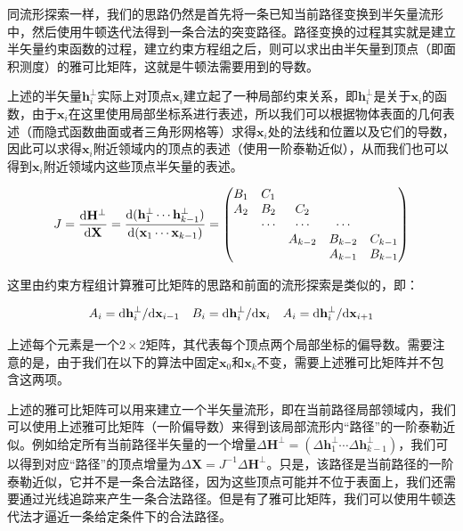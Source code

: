 同流形探索一样，我们的思路仍然是首先将一条已知当前路径变换到半矢量流形中，然后使用牛顿迭代法得到一条合法的突变路径。路径变换的过程其实就是建立半矢量约束函数的过程，建立约束方程组之后，则可以求出由半矢量到顶点（即面积测度）的雅可比矩阵，这就是牛顿法需要用到的导数。

上述的半矢量$\mathbf{h}^{\perp}_{i}$实际上对顶点$\mathbf{x}_i$建立起了一种局部约束关系，即$\mathbf{h}^{\perp}_{i}$是关于$\mathbf{x}_i$的函数，由于$\mathbf{x}_i$在这里使用局部坐标系进行表述，所以我们可以根据物体表面的几何表述（而隐式函数曲面或者三角形网格等）求得$\mathbf{x}_i$处的法线和位置以及它们的导数，因此可以求得$\mathbf{x}_i$附近领域内的顶点的表述（使用一阶泰勒近似），从而我们也可以得到$\mathbf{x}_i$附近领域内这些顶点半矢量的表述。

\begin{equation}\label{e:mlt-hslt-jacobian}
	J=\frac{{\rm d}\mathbf{H}^{\perp}}{{\rm d}\mathbf{X}}=\frac{{\rm d}(\mathbf{h}^{\perp}_1\cdots\mathbf{h}^{\perp}_{k-1})}{{\rm d}(\mathbf{x}_1\cdots\mathbf{x}_{k-1})}=\begin{pmatrix}
		B_1 & C_1    &         &         &\\
		A_2 & B_2    &  C_2    &         &\\
		    & \cdots & \cdots  & \cdots  &\\
		    &        & A_{k-2} & B_{k-2} & C_{k-1}\\
		    &        &         & A_{k-1} & B_{k-1}
	\end{pmatrix}
\end{equation}

\noindent 这里由约束方程组计算雅可比矩阵的思路和前面的流形探索是类似的，即：

\begin{equation}
\begin{aligned}
	A_i={\rm d}\mathbf{h}^{\perp}_i/{\rm d}\mathbf{x}_{i-1} && B_i={\rm d}\mathbf{h}^{\perp}_i/{\rm d}\mathbf{x}_i && A_i={\rm d}\mathbf{h}^{\perp}_i/{\rm d}\mathbf{x}_{i+1} 
\end{aligned}
\end{equation}

\noindent 上述每个元素是一个$2\times 2$矩阵，其代表每个顶点两个局部坐标的偏导数。需要注意的是，由于我们在以下的算法中固定$\mathbf{x}_0$和$\mathbf{x}_k$不变，需要上述雅可比矩阵并不包含这两项。

上述的雅可比矩阵可以用来建立一个半矢量流形，即在当前路径局部领域内，我们可以使用上述雅可比矩阵（一阶偏导数）来得到该局部流形内“路径”的一阶泰勒近似。例如给定所有当前路径半矢量的一个增量$\Delta\mathbf{H}^{\perp}=(\Delta\mathbf{h}^{\perp}_1\cdots\Delta\mathbf{h}^{\perp}_{k-1})$，我们可以得到对应“路径”的顶点增量为$\Delta\mathbf{X}=J^{-1}\Delta\mathbf{H}^{\perp}$。只是，该路径是当前路径的一阶泰勒近似，它并不是一条合法路径，因为这些顶点可能并不位于表面上，我们还需要通过光线追踪来产生一条合法路径。但是有了雅可比矩阵，我们可以使用牛顿迭代法才逼近一条给定条件下的合法路径。

